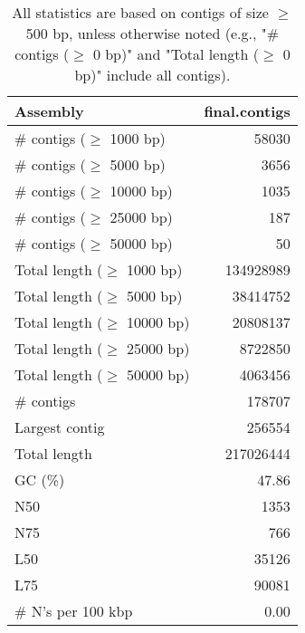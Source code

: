 \documentclass[12pt,a4paper]{article}
\begin{document}
\begin{table}[ht]
\begin{center}
\caption{All statistics are based on contigs of size $\geq$ 500 bp, unless otherwise noted (e.g., "\# contigs ($\geq$ 0 bp)" and "Total length ($\geq$ 0 bp)" include all contigs).}
\begin{tabular}{|l*{1}{|r}|}
\hline
Assembly & final.contigs \\ \hline
\# contigs ($\geq$ 1000 bp) & 58030 \\ \hline
\# contigs ($\geq$ 5000 bp) & 3656 \\ \hline
\# contigs ($\geq$ 10000 bp) & 1035 \\ \hline
\# contigs ($\geq$ 25000 bp) & 187 \\ \hline
\# contigs ($\geq$ 50000 bp) & 50 \\ \hline
Total length ($\geq$ 1000 bp) & 134928989 \\ \hline
Total length ($\geq$ 5000 bp) & 38414752 \\ \hline
Total length ($\geq$ 10000 bp) & 20808137 \\ \hline
Total length ($\geq$ 25000 bp) & 8722850 \\ \hline
Total length ($\geq$ 50000 bp) & 4063456 \\ \hline
\# contigs & 178707 \\ \hline
Largest contig & 256554 \\ \hline
Total length & 217026444 \\ \hline
GC (\%) & 47.86 \\ \hline
N50 & 1353 \\ \hline
N75 & 766 \\ \hline
L50 & 35126 \\ \hline
L75 & 90081 \\ \hline
\# N's per 100 kbp & 0.00 \\ \hline
\end{tabular}
\end{center}
\end{table}
\end{document}

